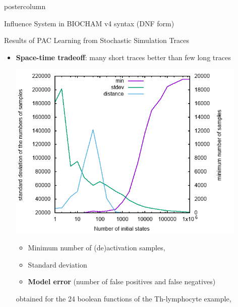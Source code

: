 \documentclass[final,hyperref={pdfpagelabels=false},xcolor=dvipsnames]{beamer}
\newlength{\columnheight}
\begin{document}
\begin{frame}[fragile]
\begin{columns}
    \begin{column}{.49\textwidth}
      \begin{beamercolorbox}[center,wd=\textwidth]{postercolumn}
        \begin{minipage}[T]{.95\textwidth} %
          \parbox[t][\columnheight]{\textwidth}{ %
            \begin{block}{Influence System in BIOCHAM v4 syntax (DNF form)}
\footnotesize
   
	    \end{block}
            \vfill
            \begin{block}{Results of PAC Learning from Stochastic Simulation Traces}
\begin{itemize}
\item
{\bf Space-time tradeoff}: many short traces better than few long traces

  \includegraphics[width=0.9\textwidth]{statistics/statistics.png}
\begin{itemize}
\item
Minimum number of (de)activation samples,
\item Standard deviation
\item {\bf Model error} (number of false positives and false negatives) 
\end{itemize}
obtained for the 24 boolean functions of the Th-lymphocyte example, 


\end{itemize}
\end{block}}
\end{minipage}
\end{beamercolorbox}
\end{column}
\end{columns}
\end{frame}
\end{document}
